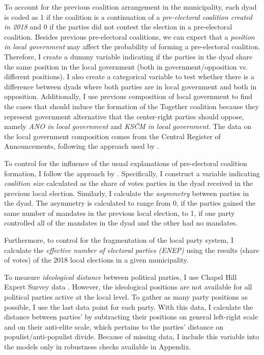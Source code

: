 \documentclass[]{interact}
\theoremstyle{plain}%
\theoremstyle{definition}
\theoremstyle{remark}
\begin{document}
To account for the previous coalition arrangement in the municipality, each dyad is coded as 1 if the coalition is a continuation of a \emph{pre-electoral coalition created in 2018} and 0 if the parties did not contest the election in a pre-electoral coalition. 
Besides previous pre-electoral coalitions, we can expect that a \emph{position in local government} may affect the probability of forming a pre-electoral coalition. Therefore, I create a dummy variable indicating if the parties in the dyad share the same position in the local government (both in government/opposition vs. different positions). I also create a categorical variable to test whether there is a difference between dyads where both parties are in local government and both in opposition. Additionally, I use previous composition of local government to find the cases that should induce the formation of the Together coalition because they represent government alternative that the center-right parties should oppose, namely \emph{ANO in local government} and \emph{KSČM in local government}. The data on the local government composition comes from the Central Register of Announcements, following the approach used by \citet{skvrnak2021}.

To control for the influence of the usual explanations of pre-electoral coalition formation, I follow the approach by \citet{golder2006}. Specifically, I construct a variable indicating \emph{coalition size} calculated as the share of votes parties in the dyad received in the previous local election. 
Similarly, I calculate the \emph{asymmetry} between parties in the dyad. The asymmetry is calculated to range from 0, if the parties gained the same number of mandates in the previous local election, to 1, if one party controlled all of the mandates in the dyad and the other had no mandates.

Furthermore, to control for the fragmentation of the local party system, I calculate the \emph{effective number of electoral parties (ENEP)} using the results (share of votes) of the 2018 local elections in a given municipality. %

To measure \emph{ideological distance} between political parties, I use Chapel Hill Expert Survey data \citep{jolly2022}. However, the ideological positions are not available for all political parties active at the local level. To gather as many party positions as possible, I use the last data point for each party. With this data, I calculate the distance between parties' by subtracting their positions on general left-right scale and on their anti-elite scale, which pertains to the parties' distance on populist/anti-populist divide. Because of missing data, I include this variable into the models only in robustness checks available in Appendix.
\end{document}
